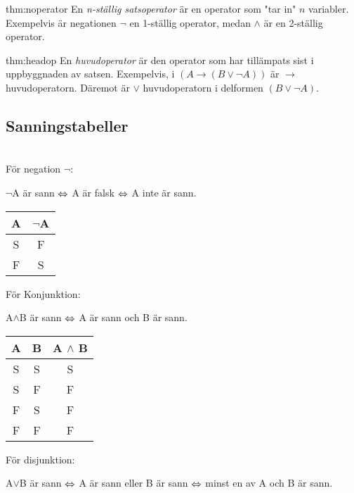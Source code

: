 \begin{theo}{thm:noperator}
  En \textit{n-ställig satsoperator} är en operator som "tar in" $n$ variabler. Exempelvis är negationen $\neg$ en 1-ställig operator, medan $\wedge$ är en 2-ställig operator.
\end{theo}
\par\bigskip

\begin{theo}[Huvudoperator]{thm:headop}
  En \textit{huvudoperator} är den operator som har tillämpats sist i uppbyggnaden av satsen. Exempelvis, i $(A\rightarrow(B\vee\neg A))$ är $\rightarrow$ huvudoperatorn. Däremot är $\vee$ huvudoperatorn i delformen $(B\vee\neg A)$.
\end{theo}
\par\bigskip
\newpage

\subsection{Sanningstabeller}\hfill\\

\noindent För negation $\neg$:
\par\bigskip
\noindent $\neg$A är sann $\Leftrightarrow$ A är falsk $\Leftrightarrow$ A inte är sann.
\par\bigskip

\noindent\begin{tabular}{|c|c|}
  \hline
  A&$\neg$A\\
  \hline
  S&F\\
  \hline
  F&S\\\hline
\end{tabular}
\par\bigskip

\noindent För Konjunktion:
\par\bigskip
\noindent A$\wedge$B är sann $\Leftrightarrow$ A är sann och B är sann.
\par\bigskip

\noindent\begin{tabular}{|c|c|c|}
  \hline
  A & B & A $\wedge$ B\\
  \hline
  S&S&S\\
  \hline
  S&F&F\\
  \hline
  F&S&F\\
  \hline
  F&F&F\\
  \hline
\end{tabular}
\par\bigskip

\noindent För disjunktion:
\par\bigskip
\noindent A$\vee$B är sann $\Leftrightarrow$ A är sann eller B är sann $\Leftrightarrow$ minst en av A och B är sann.
\par\bigskip

